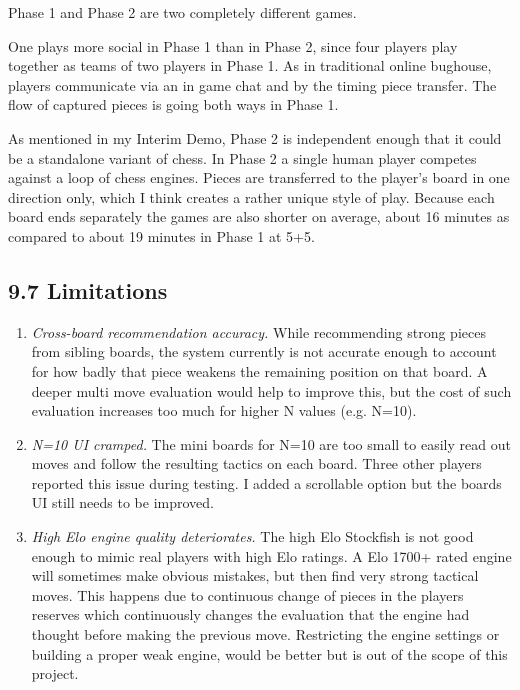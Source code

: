\documentclass[11pt,a4paper]{article}
\begin{document}
Phase 1 and Phase 2 are two completely different games.

One plays more social in Phase 1 than in Phase 2, since four players play together as teams of two players in Phase 1. As in traditional online bughouse, players communicate via an in game chat and by the timing piece transfer. The flow of captured pieces is going both ways in Phase 1. 

As mentioned in my Interim Demo, Phase 2 is independent enough that it could be a standalone variant of chess. In Phase 2 a single human player competes against a loop of chess engines. Pieces are transferred to the player’s board in one direction only, which I think creates a rather unique style of play. Because each board ends separately the games are also shorter on average, about 16 minutes as compared to about 19 minutes in Phase 1 at 5+5.

\subsection*{9.7 Limitations}

\begin{enumerate}[leftmargin=*]

\item \textit{Cross-board recommendation accuracy.} While recommending strong pieces from sibling boards, the system currently is not accurate enough to account for how badly that piece weakens the remaining position on that board. A deeper multi move evaluation would help to improve this, but the cost of such evaluation increases too much for higher N values (e.g. N=10).

\item \textit{N=10 UI cramped.} The mini boards for N=10 are too small to easily read out moves and follow the resulting tactics on each board. Three other players reported this issue during testing. I added a scrollable option but the boards UI still needs to be improved.

\item \textit{High Elo engine quality deteriorates.} The high Elo Stockfish is not good enough to mimic real players with high Elo ratings. A Elo 1700+ rated engine will sometimes make obvious mistakes, but then find very strong tactical moves. This happens due to continuous change of pieces in the players reserves which continuously changes the evaluation that the engine had thought before making the previous move. Restricting the engine settings or building a proper weak engine, would be better but is out of the scope of this project.

\end{enumerate}
\end{document}

